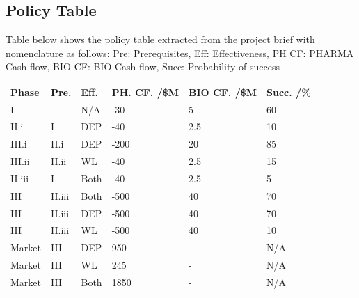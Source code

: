 \documentclass[journal]{IEEEtran}
\begin{document}
\subsection{Policy Table}
\label{sec:pol}
Table below shows the policy table extracted from the project brief with nomenclature as follows: Pre: Prerequisites, Eff: Effectiveness,  PH CF: PHARMA Cash flow, BIO CF: BIO Cash flow, Succ: Probability of success
\begin{table}[h]
\begin{tabular}{llllll}
\textbf{Phase} & \textbf{Pre.} & \textbf{Eff.} & \textbf{PH. CF. /\$M} & \textbf{BIO CF. /\$M} & \textbf{Succ. /\%} \\
I              & -                     & N/A                    & -30                                  & 5                                 & 60                               \\
II.i           & I                     & DEP             & -40                                  & 2.5                               & 10                               \\
III.i          & II.i                  & DEP             & -200                                 & 20                                & 85                               \\
III.ii         & II.ii                 & WL            & -40                                  & 2.5                               & 15                               \\
II.iii         & I                     & Both                   & -40                                  & 2.5                               & 5                                \\
III            & II.iii                & Both                   & -500                                 & 40                                & 70                               \\
III            & II.iii                & DEP             & -500                                 & 40                                & 70                               \\
III            & II.iii                & WL            & -500                                 & 40                                & 10                               \\
Market         & III                   & DEP             & 950                                  & -                                 & N/A                              \\
Market         & III                   & WL            & 245                                  & -                                 & N/A                              \\
Market         & III                   & Both                   & 1850                                 & -                                 & N/A                             
\end{tabular}
\end{table}
\ifCLASSOPTIONcaptionsoff
  \newpage
\fi
\end{document}
